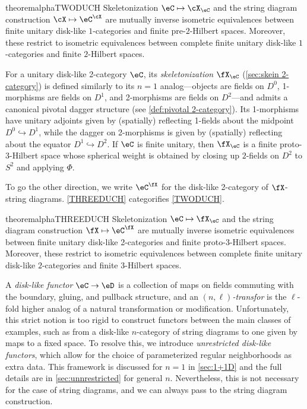 \documentclass[12pt,reqno]{amsart}
\newcounter{alpha}\renewcommand\thealpha{\upshape\Alph{alpha}}
\newcommand{\psn}{\Phi}
\newcommand{\C}{\eC}
\newcommand{\D}{\eD}
\newcommand{\defn}[1]{\emph{#1}}
\begin{document}
\begin{restatable}{theoremalpha}{TWODUCH}
    \label{TWODUCH}
Skeletonization $\C\mapsto\cX_\C$ and the string diagram construction $\cX\mapsto\C^\cX$ are mutually inverse isometric equivalences between finite unitary disk-like $1$-categories and finite pre-$2$-Hilbert spaces. Moreover, these restrict to isometric equivalences between complete finite unitary disk-like $1$-categories and finite $2$-Hilbert spaces.
\end{restatable}

For a unitary disk-like 2-category $\C$, its \defn{skeletonization} $\fX_\C$ (\cref{sec:skein 2-category}) is defined similarly to its $n=1$ analog---objects are fields on $D^0$, 1-morphisms are fields on $D^1$, and 2-morphisms are fields on $D^2$---and admits a canonical pivotal dagger structure (see \cref{def:pivotal 2-category}). Its 1-morphisms have unitary adjoints given by (spatially) reflecting 1-fields about the midpoint $D^0\hookrightarrow D^1$, while the dagger on 2-morphisms is given by (spatially) reflecting about the equator $D^1\hookrightarrow D^2$. If $\C$ is finite unitary, then $\fX_\C$ is a finite proto-$3$-Hilbert space whose spherical weight is obtained by closing up $2$-fields on $D^2$ to $S^2$ and applying $\psn$.

To go the other direction, we write $\C^\fX$ for the disk-like 2-category of $\fX$-string diagrams.
\cref{THREEDUCH} categorifies \cref{TWODUCH}.

\begin{restatable}{theoremalpha}{THREEDUCH}
    \label{THREEDUCH}
    Skeletonization $\C\mapsto\fX_\C$ and the string diagram construction $\fX\mapsto\C^\fX$ are mutually inverse isometric equivalences between finite unitary disk-like 2-categories and finite proto-3-Hilbert spaces. Moreover, these restrict to isometric equivalences between complete finite unitary disk-like $2$-categories and finite $3$-Hilbert spaces.
\end{restatable}

A \defn{disk-like functor} $\C\to\D$ is a collection of maps on fields commuting with the boundary, gluing, and pullback structure, and an \defn{$(n,\ell)$-transfor} is the $\ell$-fold higher analog of a natural transformation or modification. Unfortunately, this strict notion is too rigid to construct functors between the main classes of examples, such as from a disk-like $n$-category of string diagrams to one given by maps to a fixed space. To resolve this, we introduce \defn{unrestricted disk-like functors}, which allow for the choice of parameterized regular neighborhoods as extra data. This framework is discussed for $n=1$ in \cref{sec:1+1D} and the full details are in \cref{sec:unnrestricted} for general $n$. Nevertheless, this is not necessary for the case of string diagrams, and we can always pass to the string diagram construction. 
\end{document}

